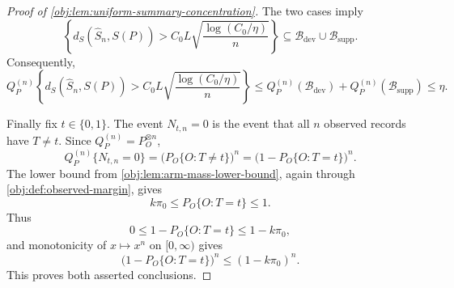 \documentclass[11pt]{article}
\begin{document}
\begin{proof}[Proof of \cref{obj:lem:uniform-summary-concentration}]
The two cases imply
\[
\left\{
d_S(\widehat S_n,S(P))>
C_0L\sqrt{\frac{\log(C_0/\eta)}{n}}
\right\}
\subseteq
\mathcal B_{\mathrm{dev}}\cup\mathcal B_{\mathrm{supp}}.
\]
Consequently,
\[
Q_P^{(n)}
\left\{
d_S(\widehat S_n,S(P))>
C_0L\sqrt{\frac{\log(C_0/\eta)}{n}}
\right\}
\le
Q_P^{(n)}(\mathcal B_{\mathrm{dev}})
+
Q_P^{(n)}(\mathcal B_{\mathrm{supp}})
\le
\eta .
\]  %

Finally fix \(t\in\{0,1\}\).  The event \(N_{t,n}=0\) is the event that all
\(n\) observed records have \(T\ne t\).  Since
\(Q_P^{(n)}=P_O^{\otimes n}\),
\[
Q_P^{(n)}\{N_{t,n}=0\}
=
\bigl(P_O\{O:T\ne t\}\bigr)^n
=
\bigl(1-P_O\{O:T=t\}\bigr)^n .
\]
The lower bound from \cref{obj:lem:arm-mass-lower-bound}, again through
\cref{obj:def:observed-margin}, gives
\[
k\pi_0\le P_O\{O:T=t\}\le 1.
\]
Thus
\[
0\le 1-P_O\{O:T=t\}\le 1-k\pi_0,
\]
and monotonicity of \(x\mapsto x^n\) on \([0,\infty)\) gives
\[
\bigl(1-P_O\{O:T=t\}\bigr)^n
\le
(1-k\pi_0)^n .
\]
This proves both asserted conclusions.  %
\end{proof}
\end{document}
